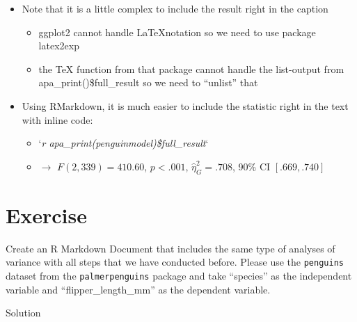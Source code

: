 \documentclass[
]{book}
\providecommand{\tightlist}{%
  \setlength{\itemsep}{0pt}\setlength{\parskip}{0pt}}
\begin{document}
\begin{itemize}
\tightlist
\item
  Note that it is a little complex to include the result right in the caption

  \begin{itemize}
  \tightlist
  \item
    ggplot2 cannot handle \LaTeX notation so we need to use package latex2exp
  \item
    the TeX function from that package cannot handle the list-output from apa\_print()\$full\_result so we need to ``unlist'' that
  \end{itemize}
\item
  Using RMarkdown, it is much easier to include the statistic right in the text with inline code:

  \begin{itemize}
  \tightlist
  \item
    `\emph{r apa\_print(penguinmodel)\$full\_result}`
  \item
    \(\rightarrow\) { \(F(2, 339) = 410.60\), \(p < .001\), \(\hat{\eta}^2_G = .708\), 90\% CI \([.669, .740]\) }
  \end{itemize}
\end{itemize}

\section*{Exercise}\label{exercise-8}

Create an R Markdown Document that includes the same type of analyses of variance with all steps that we have conducted before.
Please use the \texttt{penguins} dataset from the \texttt{palmerpenguins} package and take ``species'' as the independent variable and ``flipper\_length\_mm'' as the dependent variable.

Solution
\end{document}
